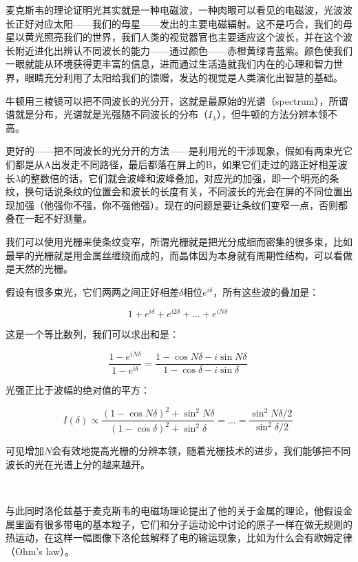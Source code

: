 麦克斯韦的理论证明光其实就是一种电磁波，一种肉眼可以看见的电磁波，光波波长正好对应太阳——我们的母星——发出的主要电磁辐射。这不是巧合，我们的母星以黄光照亮我们的世界，我们人类的视觉器官也主要适应这个波长，并在这个波长附近进化出辨认不同波长的能力——通过颜色——赤橙黄绿青蓝紫。颜色使我们一眼就能从环境获得更丰富的信息，进而通过生活造就我们内在的心理和智力世界，眼睛充分利用了太阳给我们的馈赠，发达的视觉是人类演化出智慧的基础。

牛顿用三棱镜可以把不同波长的光分开，这就是最原始的光谱（spectrum），所谓谱就是分布，光谱就是光强随不同波长的分布（$I_{\lambda}$），但牛顿的方法分辨本领不高。

更好的——把不同波长的光分开的方法——是利用光的干涉现象，假如有两束光它们都是从A出发走不同路径，最后都落在屏上的B，如果它们走过的路正好相差波长$\lambda$的整数倍的话，它们就会波峰和波峰叠加，对应光的加强，即一个明亮的条纹，换句话说条纹的位置会和波长的长度有关，不同波长的光会在屏的不同位置出现加强（他强你不强，你不强他强）。现在的问题是要让条纹们变窄一点，否则都叠在一起不好测量。

我们可以使用光栅来使条纹变窄，所谓光栅就是把光分成细而密集的很多束，比如最早的光栅就是用金属丝缠绕而成的，而晶体因为本身就有周期性结构，可以看做是天然的光栅。

假设有很多束光，它们两两之间正好相差$\delta$相位$e^{i \delta}$，所有这些波的叠加是：

\begin{equation}
1 + e^{i \delta} + e^{i 2 \delta } + ... + e^{i N \delta}~
\end{equation}

这是一个等比数列，我们可以求出和是：

\begin{equation}
\frac{1 - e^{i N \delta}}{ 1 - e^{i \delta}} = \frac{ 1- \cos N \delta - i \sin N \delta }{ 1- \cos \delta - i \sin \delta}~
\end{equation}

光强正比于波幅的绝对值的平方：

\begin{equation}
I(\delta) \propto \frac{( 1 - \cos N \delta)^2 + \sin^2 N \delta  }{  (1 - \cos \delta)^2 + \sin^2 \delta } = ... = \frac{\sin^2 N\delta /2}{\sin^2 \delta /2} ~
\end{equation}

可见增加$N$会有效地提高光栅的分辨本领，随着光栅技术的进步，我们能够把不同波长的光在光谱上分的越来越开。

~

与此同时洛伦兹基于麦克斯韦的电磁场理论提出了他的关于金属的理论，他假设金属里面有很多带电的基本粒子，它们和分子运动论中讨论的原子一样在做无规则的热运动，在这样一幅图像下洛伦兹解释了电的输运现象，比如为什么会有欧姆定律（Ohm's law）。

